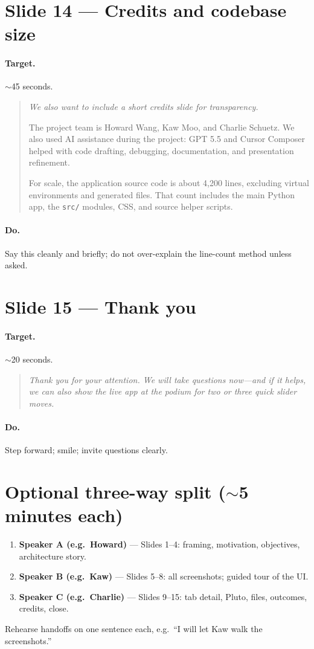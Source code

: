 \documentclass[11pt,a4paper]{article}
\newcommand{\speak}[1]{%
  \begin{quote}\itshape #1\end{quote}%
}
\newcommand{\doitem}[1]{\paragraph{Do.} #1\par\vspace{0.6em}}
\begin{document}
\section{Slide 14 --- Credits and codebase size}

\paragraph{Target.} $\sim$45 seconds.

\speak{%
We also want to include a short credits slide for transparency.

The project team is Howard Wang, Kaw Moo, and Charlie Schuetz. We also used AI assistance during the project: GPT 5.5 and Cursor Composer helped with code drafting, debugging, documentation, and presentation refinement.

For scale, the application source code is about 4,200 lines, excluding virtual environments and generated files. That count includes the main Python app, the \texttt{src/} modules, CSS, and source helper scripts.%
}

\doitem{Say this cleanly and briefly; do not over-explain the line-count method unless asked.}

\section{Slide 15 --- Thank you}

\paragraph{Target.} $\sim$20 seconds.

\speak{%
Thank you for your attention. We will take questions now---and if it helps, we can also show the live app at the podium for two or three quick slider moves.%
}

\doitem{Step forward; smile; invite questions clearly.}

\section*{Optional three-way split ($\sim$5 minutes each)}

\begin{enumerate}
    \item \textbf{Speaker A (e.g.\ Howard)} --- Slides 1--4: framing, motivation, objectives, architecture story.
    \item \textbf{Speaker B (e.g.\ Kaw)} --- Slides 5--8: all screenshots; guided tour of the UI.
    \item \textbf{Speaker C (e.g.\ Charlie)} --- Slides 9--15: tab detail, Pluto, files, outcomes, credits, close.
\end{enumerate}
Rehearse handoffs on one sentence each, e.g.\ ``I will let Kaw walk the screenshots.''
\end{document}
